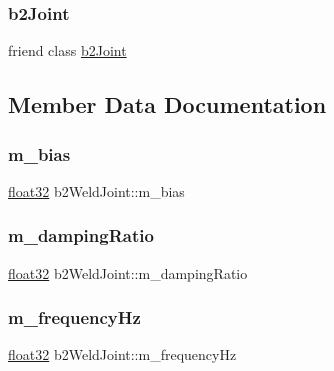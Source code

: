 \subsubsection{\texorpdfstring{b2Joint}{b2Joint}}
{\footnotesize\ttfamily friend class \mbox{\hyperlink{classb2_joint}{b2\+Joint}}\hspace{0.3cm}{\ttfamily [friend]}}



\subsection{Member Data Documentation}
\mbox{\label{classb2_weld_joint_af54a943c1476e6a7c7bcfdf6cf568ba3}} 
\subsubsection{\texorpdfstring{m\_bias}{m\_bias}}
{\footnotesize\ttfamily \mbox{\hyperlink{b2_settings_8h_aacdc525d6f7bddb3ae95d5c311bd06a1}{float32}} b2\+Weld\+Joint\+::m\+\_\+bias\hspace{0.3cm}{\ttfamily [protected]}}

\mbox{\label{classb2_weld_joint_a4a730af358f79a6ccd7641e198eb5c7b}} 
\subsubsection{\texorpdfstring{m\_dampingRatio}{m\_dampingRatio}}
{\footnotesize\ttfamily \mbox{\hyperlink{b2_settings_8h_aacdc525d6f7bddb3ae95d5c311bd06a1}{float32}} b2\+Weld\+Joint\+::m\+\_\+damping\+Ratio\hspace{0.3cm}{\ttfamily [protected]}}

\mbox{\label{classb2_weld_joint_aa3cd6f08f509f67ad068d0ded7df9f21}} 
\subsubsection{\texorpdfstring{m\_frequencyHz}{m\_frequencyHz}}
{\footnotesize\ttfamily \mbox{\hyperlink{b2_settings_8h_aacdc525d6f7bddb3ae95d5c311bd06a1}{float32}} b2\+Weld\+Joint\+::m\+\_\+frequency\+Hz\hspace{0.3cm}{\ttfamily [protected]}}

